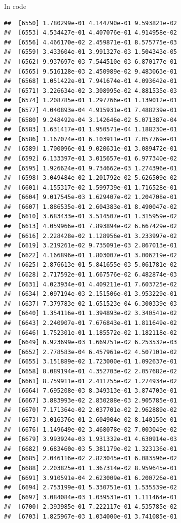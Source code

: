 \documentclass[ignorenonframetext,]{beamer}
\begin{document}
\begin{frame}[fragile]{In code}
\begin{verbatim}
##  [6550] 1.780299e-01 4.144790e-01 9.593821e-02
##  [6553] 4.534427e-01 4.407076e-01 4.914958e-02
##  [6556] 4.466170e-02 2.459871e-01 8.575775e-03
##  [6559] 3.433604e-01 3.991327e-03 1.504343e-05
##  [6562] 9.937697e-03 7.544510e-03 6.870177e-01
##  [6565] 9.516128e-03 2.450989e-02 9.483063e-01
##  [6568] 1.051422e-01 7.941674e-01 4.093642e-01
##  [6571] 3.226634e-02 3.308995e-02 4.881535e-03
##  [6574] 1.208785e-01 1.297766e-01 1.139012e-01
##  [6577] 4.040893e-04 4.915931e-01 7.488239e-01
##  [6580] 9.248492e-04 3.142646e-02 5.071387e-04
##  [6583] 1.631417e-01 1.950571e-04 1.188230e-01
##  [6586] 1.167074e-01 6.103911e-01 7.057769e-01
##  [6589] 1.700096e-01 9.020631e-01 3.089472e-01
##  [6592] 6.133397e-01 3.015657e-01 6.977340e-02
##  [6595] 1.926624e-01 9.734662e-03 1.274396e-01
##  [6598] 3.049484e-02 1.201792e-02 5.626509e-02
##  [6601] 4.155317e-02 1.599739e-01 1.716528e-01
##  [6604] 9.017545e-03 1.629407e-02 1.204708e-01
##  [6607] 1.886535e-01 2.604383e-01 8.490047e-02
##  [6610] 3.683433e-01 3.514507e-01 1.315959e-02
##  [6613] 4.059966e-01 7.893894e-02 6.667429e-02
##  [6616] 2.228428e-02 1.128956e-01 3.233997e-02
##  [6619] 3.219261e-02 9.735091e-03 2.867013e-01
##  [6622] 4.166896e-01 1.803007e-01 3.006219e-02
##  [6625] 2.876613e-01 5.841655e-03 5.061781e-02
##  [6628] 2.717592e-01 1.667576e-02 6.482874e-03
##  [6631] 4.023934e-01 4.409211e-01 7.603725e-02
##  [6634] 2.097194e-03 2.151506e-01 3.953229e-01
##  [6637] 7.379783e-02 1.651523e-04 6.300339e-03
##  [6640] 1.354116e-01 1.394893e-02 3.340541e-02
##  [6643] 2.240907e-01 7.676843e-01 1.811649e-02
##  [6646] 1.752301e-01 1.185572e-02 1.182118e-02
##  [6649] 6.923699e-03 1.669751e-02 6.253532e-03
##  [6652] 2.778583e-04 6.457961e-02 4.507101e-02
##  [6655] 3.151889e-02 1.723000e-01 1.092637e-01
##  [6658] 8.089194e-01 4.352703e-02 2.057682e-02
##  [6661] 8.759911e-01 2.411755e-02 1.274934e-02
##  [6664] 7.695208e-03 8.349313e-01 3.874703e-01
##  [6667] 3.883993e-02 2.830288e-03 2.905785e-01
##  [6670] 7.171364e-02 2.037701e-02 2.962889e-02
##  [6673] 3.016376e-01 2.604904e-02 8.140150e-01
##  [6676] 1.149649e-02 3.468078e-02 7.003049e-02
##  [6679] 3.993924e-03 1.931332e-01 4.630914e-03
##  [6682] 9.683460e-03 5.381179e-02 1.323136e-01
##  [6685] 2.046116e-02 2.823045e-01 6.083596e-02
##  [6688] 2.203825e-01 1.367314e-02 8.959645e-01
##  [6691] 3.910591e-04 2.623009e-01 6.200726e-01
##  [6694] 2.753199e-01 5.330751e-01 1.535539e-02
##  [6697] 3.084084e-03 1.039531e-01 1.111464e-01
##  [6700] 2.393985e-01 7.222117e-01 4.535785e-02
##  [6703] 1.825967e-03 1.034000e-01 3.741085e-01

\end{verbatim}
\end{frame}
\end{document}
